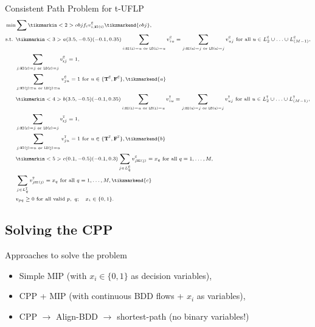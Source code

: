 \documentclass[10pt, xcolor=svgnames]{beamer}
\begin{document}
\begin{frame}[label={sec:orgf612a46}]{Consistent Path Problem for t-UFLP}
\begin{subequations}
\scriptsize
  \begin{align*}
    \min & \sum \tikzmarkin<2>{obj}f_i v^{\cov}_{i,\hi{i}}\tikzmarkend{obj},\\
    \textrm{s.t. } & \tikzmarkin<3>{a}(3.5,-0.5)(-0.1,0.35)\sum_{i:\hi{i}=u\textrm{ or }\lo{i}=u}v^{\cov}_{iu} = \sum_{j:\hi{u}=j\textrm{ or } \lo{u}=j}v^{\cov}_{uj} \textrm{ for all } u\in L_2^{\cov}\cup\ldots\cup L_{(M-1)}^{\cov},\\
         & \sum_{j:\hi{\ROOT}=j\textrm{ or } \lo{\ROOT}=j}v^{\cov}_{\ROOT{}j} = 1,\\
         & \sum_{j:\hi{j}=u\textrm{ or } \lo{j}=u}v^{\cov}_{ju} = 1 \textrm{ for } u\in \{\T^{\cov},\F^{\cov}\},\tikzmarkend{a}\\
         & \tikzmarkin<4>{b}(3.5,-0.5)(-0.1,0.35)\sum_{i:\hi{i}=u\textrm{ or }\lo{i}=u}v^{\type}_{iu} = \sum_{j:\hi{u}=j\textrm{ or } \lo{u}=j}v^{\type}_{uj} \textrm{ for all } u\in L_2^{\type}\cup\ldots\cup L_{(M-1)}^{\type},\\
         & \sum_{j:\hi{\ROOT}=j\textrm{ or } \lo{\ROOT}=j}v^{\type}_{\ROOT{}j} = 1,\\
         & \sum_{j:\hi{j}=u\textrm{ or } \lo{j}=u}v^{\type}_{ju} = 1 \textrm{ for } u\in \{\T^{\type},\F^{\type}\},\tikzmarkend{b}\\
         &\tikzmarkin<5>{c}(0.1,-0.5)(-0.1,0.3) \sum_{j\in L^{\cov}_q} v^{\cov}_{j\hi{j}} = x_q \textrm{ for all } q=1,\ldots,M,\\
         & \sum_{j\in L^{\type}_q} v^{\type}_{j\hi{j}} = x_q \textrm{ for all } q=1,\ldots,M,\tikzmarkend{c}\\
         & v_{pq}\geq 0 \textrm{ for all valid } p,~q;\quad x_i\in\{0,1\}.
  \end{align*}
\end{subequations}
\end{frame}

\subsection{Solving the CPP}
\label{sec:orgf678273}
\begin{frame}[label={sec:orgb705f8e}]{Approaches to solve the problem}
\begin{itemize}
\item Simple MIP (with \(x_i\in\{0,1\}\) as decision variables),
\item CPP + MIP (with continuous BDD flows + \(x_i\) as variables),
\item CPP \(\rightarrow\) Align-BDD \(\rightarrow\) shortest-path (no binary variables!)
\end{itemize}
\end{frame}
\end{document}
